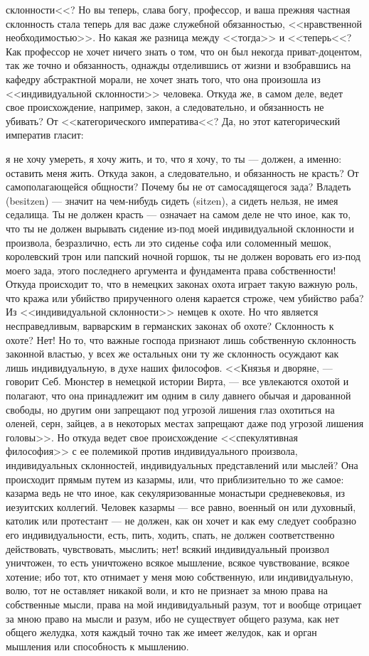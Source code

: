 \documentclass[12pt]{article}
\begin{document}
склонности<<? Но вы теперь, слава богу, профессор, и ваша прежняя частная склонность стала теперь для вас даже служебной обязанностью, <<нравственной необходимостью>>. Но какая же разница между <<тогда>> и <<теперь<<? Как профессор не хочет ничего знать о том, что он был некогда приват-доцентом, так же точно и обязанность, однажды отделившись от жизни и взобравшись на кафедру абстрактной морали, не хочет знать того, что она произошла из <<индивидуальной склонности>> человека. Откуда же, в самом деле, ведет свое происхождение, например, закон, а следовательно, и обязанность не убивать? От <<категорического императива<<? Да, но этот категорический императив гласит: 

я не хочу умереть, я хочу жить, и то, что я хочу, то ты --- должен, а именно: оставить меня жить. Откуда закон, а следовательно, и обязанность не красть? От самополагающейся общности? Почему бы не от самосадящегося зада? Владеть (besitzen) --- значит на чем-нибудь сидеть (sitzen), а сидеть нельзя, не имея седалища. Ты не должен красть --- означает на самом деле не что иное, как то, что ты не должен вырывать сидение из-под моей индивидуальной склонности и произвола, безразлично, есть ли это сиденье софа или соломенный мешок, королевский трон или папский ночной горшок, ты не должен воровать его из-под моего зада, этого последнего аргумента и фундамента права собственности! Откуда происходит то, что в немецких законах охота играет такую важную роль, что кража или убийство прирученного оленя карается строже, чем убийство раба? Из <<индивидуальной склонности>> немцев к охоте. Но что является несправедливым, варварским в германских законах об охоте? Склонность к охоте? Нет! Но то, что важные господа признают лишь собственную склонность законной властью, у всех же остальных они ту же склонность осуждают как лишь индивидуальную, в духе наших философов. <<Князья и дворяне, --- говорит Себ. Мюнстер в немецкой истории Вирта, --- все увлекаются охотой и полагают, что она принадлежит им одним в силу давнего обычая и дарованной свободы, но другим они запрещают под угрозой лишения глаз охотиться на оленей, серн, зайцев, а в некоторых местах запрещают даже под угрозой лишения головы>>. Но откуда ведет свое происхождение <<спекулятивная философия>> с ее полемикой против индивидуального произвола, индивидуальных склонностей, индивидуальных представлений или мыслей? Она происходит прямым путем из казармы, или, что приблизительно то же самое: казарма ведь не что иное, как секуляризованные монастыри средневековья, из иезуитских коллегий. Человек казармы --- все равно, военный он или духовный, католик или протестант --- не должен, как он хочет и как ему следует сообразно его индивидуальности, есть, пить, ходить, спать, не должен соответственно действовать, чувствовать, мыслить; нет! всякий индивидуальный произвол уничтожен, то есть уничтожено всякое мышление, всякое чувствование, всякое хотение; ибо тот, кто отнимает у меня мою собственную, или индивидуальную, волю, тот не оставляет никакой воли, и кто не признает за мною права на собственные мысли, права на мой индивидуальный разум, тот и вообще отрицает за мною право на мысли и разум, ибо не существует общего разума, как нет общего желудка, хотя каждый точно так же имеет желудок, как и орган мышления или способность к мышлению. 
\end{document}
